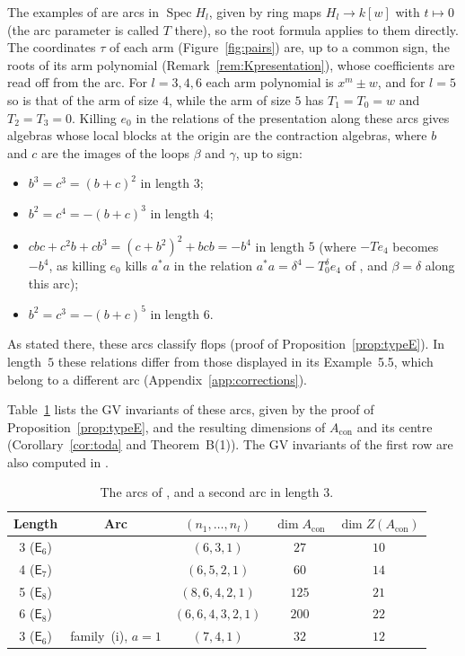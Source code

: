 \documentclass[11pt]{amsart}
\makeatletter
\numberwithin{table}{section}
\numberwithin{figure}{section}
\numberwithin{equation}{section}
\theoremstyle{definition}
\theoremstyle{plain}
\newcommand{\Acon}{A_{\mathrm{con}}}
\DeclareMathOperator{\Spec}{Spec}
\renewcommand\paragraph{\@startsection{paragraph}{4}{\z@}{\medskipamount}{-.5em}{\normalfont\bfseries}}
\makeatother
\begin{document}
\paragraph{Explicit arcs.} The examples of \cite[Examples~5.3--5.5]{K} are arcs in $\Spec H_l$, given by ring maps $H_l \to k[w]$ with $t \mapsto 0$ (the arc parameter is called $T$ there), so the root formula applies to them directly. The coordinates $\tau$ of each arm (Figure~\ref{fig:pairs}) are, up to a common sign, the roots of its arm polynomial (Remark~\ref{rem:Kpresentation}), whose coefficients are read off from the arc. For $l = 3, 4, 6$ each arm polynomial is $x^m \pm w$, and for $l = 5$ so is that of the arm of size $4$, while the arm of size $5$ has $T_1 = T_0 = w$ and $T_2 = T_3 = 0$. Killing $e_0$ in the relations of the presentation along these arcs gives algebras whose local blocks at the origin are the contraction algebras, where $b$ and $c$ are the images of the loops $\beta$ and $\gamma$, up to sign:
\begin{itemize}
\item $b^3 = c^3 = (b + c)^2$ in length $3$;
\item $b^2 = c^4 = -(b + c)^3$ in length $4$;
\item $cbc + c^2b + cb^3 = (c + b^2)^2 + bcb = -b^4$ in length $5$ (where $-Te_4$ becomes $-b^4$, as killing $e_0$ kills $a^*a$ in the relation $a^*a = \delta^4 - T_0^\delta e_4$ of \cite[Thm~1.3(5)]{K}, and $\beta = \delta$ along this arc);
\item $b^2 = c^3 = -(b + c)^5$ in length $6$.
\end{itemize}
As stated there, these arcs classify flops (proof of Proposition~\ref{prop:typeE}). In length~$5$ these relations differ from those displayed in its Example~5.5, which belong to a different arc (Appendix~\ref{app:corrections}).

Table~\ref{tab:arcs} lists the GV invariants of these arcs, given by the proof of Proposition~\ref{prop:typeE}, and the resulting dimensions of $\Acon$ and its centre (Corollary~\ref{cor:toda} and Theorem~B(1)). The GV invariants of the first row are also computed in \cite[Example~5.3]{K}.

\begin{table}[ht]
\caption{The arcs of \cite[Examples~5.3--5.5]{K}, and a second arc in length $3$.}\label{tab:arcs}
\begin{tabular}{@{}ccccc@{}}
\toprule
Length & Arc & $(n_1, \dots, n_l)$ & $\dim \Acon$ & $\dim Z(\Acon)$ \\
\midrule
3 ($\mathsf{E}_6$) & \cite[5.3]{K} & $(6, 3, 1)$ & $27$ & $10$ \\
4 ($\mathsf{E}_7$) & \cite[5.4]{K} & $(6, 5, 2, 1)$ & $60$ & $14$ \\
5 ($\mathsf{E}_8$) & \cite[5.5]{K} & $(8, 6, 4, 2, 1)$ & $125$ & $21$ \\
6 ($\mathsf{E}_8$) & \cite[5.4]{K} & $(6, 6, 4, 3, 2, 1)$ & $200$ & $22$ \\
3 ($\mathsf{E}_6$) & family~(i), $a = 1$ & $(7, 4, 1)$ & $32$ & $12$ \\
\bottomrule
\end{tabular}
\end{table}
\end{document}
